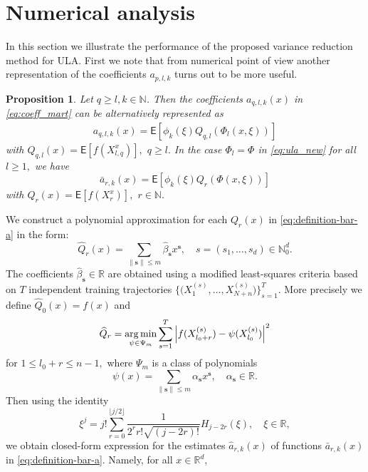 \documentclass[bj]{imsart}
\def\nset{\mathbb{N}}
\newtheorem{prop}[thm]{Proposition}
\newcommand*{\argmin}{\operatornamewithlimits{arg\,min}}
\begin{document}
\section{Numerical analysis}
\label{sec:num}
In this section we illustrate the performance of the proposed variance reduction method for ULA.
First we note that from  numerical point of view another representation of the coefficients \(a_{p,l,k}\)  turns out to be more useful.
\begin{prop}
Let $q\geq l, k\in \nset$. Then the coefficients \(a_{q,l,k}(x)\) in \eqref{eq:coeff_mart}  can be alternatively represented as
\begin{eqnarray*}
a_{q,l,k}(x)=\mathsf{E}\left[\phi_k\left(\xi\right)Q_{q,l}\left(\Phi_l(x,\xi)\right)\right]
\end{eqnarray*}
with \(Q_{q,l}(x)=\mathsf{E}\left[f(X^x_{l,q})\right],\) \(q\geq l.\)
In the case $\Phi_l=\Phi$ in \eqref{eq:ula_new} for all $l\geq 1,$ we have
\begin{equation}
\label{eq:definition-bar-a}
\bar a_{r,k}(x)=\mathsf{E}\left[\phi_k\left(\xi\right)Q_{r}\left(\Phi(x,\xi)\right)\right]
\end{equation}
with  \(Q_{r}(x)=\mathsf{E}\left[f(X^x_{r})\right],\) $r\in \mathbb{N}.$
\end{prop}
 We construct a polynomial approximation  for each \(Q_r(x)\) in \eqref{eq:definition-bar-a} in the form:
\begin{equation*}
\widehat{Q}_{r}(x) = \sum_{\|\mathbf{s}\|\leq m} \widehat\beta_{\mathbf{s}} x^{\mathbf{s}},\quad s=(s_1,\ldots,s_d) \in \nset_0^d.
\end{equation*}
The coefficients \(\widehat \beta_{\mathbf{s}}\in \mathbb{R}\) are obtained using a modified least-squares criteria based on $T$ independent training trajectories \(\bigl\{\bigl(X_1^{(s)},\ldots,X_{N+n}^{(s)}\bigr)\bigr\}_{s=1}^{T}\). More precisely  we define $\widehat{Q}_0(x) = f(x)$ and
\begin{eqnarray}
\label{eq:Qregr}
\widehat{Q}_r = \argmin_{\psi \in \Psi_m} \sum_{s = 1}^{T}  \left| f(X_{l_0+r}^{(s)}) - \psi(X_{l_0}^{(s)})\right|^2
\end{eqnarray}
for \(1 \leq l_0+r \leq n-1,\) where $\Psi_m$ is a class of polynomials 
\[
 \psi(x) = \sum_{\|\mathbf{s}\|\leq m} \alpha_{\mathbf{s}} x^{\mathbf{s}}, \quad \alpha_{\mathbf{s}}\in \mathbb{R}.
\] 
Then using the identity
\[
\xi^j = j! \sum_{r = 0}^{\lfloor j/2 \rfloor} \frac{1}{2^r  r! \sqrt{(j-2r)!}} H_{j-2r}(\xi),\quad \xi \in \mathbb{R},
\]
we obtain closed-form expression for the estimates $\widehat a_{r,k}(x)$ of functions $\bar a_{r,k}(x)$ in \eqref{eq:definition-bar-a}. Namely, for all $x \in \mathbb{R}^d$,
\end{document}
